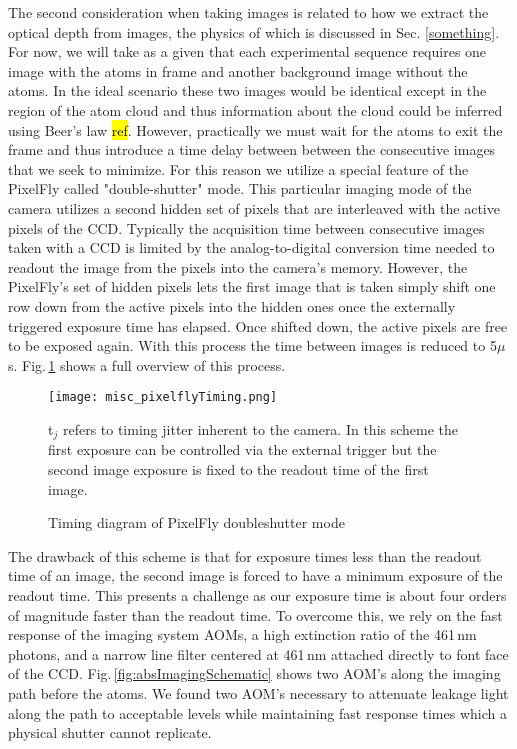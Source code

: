 The second consideration when taking images is related to how we extract the optical depth from images, the physics of which is discussed in Sec. \ref{something}.
For now, we will take as a given that each experimental sequence requires one image with the atoms in frame and another background image without the atoms.
In the ideal scenario these two images would be identical except in the region of the atom cloud and thus information about the cloud could be inferred using Beer's law \hl{ref}.
However, practically we must wait for the atoms to exit the frame and thus introduce a time delay between between the consecutive images that we seek to minimize.
For this reason we utilize a special feature of the PixelFly called "double-shutter" mode.
This particular imaging mode of the camera utilizes a second hidden set of pixels that are interleaved with the active pixels of the CCD.
Typically the acquisition time between consecutive images taken with a CCD is limited by the analog-to-digital conversion time needed to readout the image from the pixels into the camera's memory.
However, the PixelFly's set of hidden pixels lets the first image that is taken simply shift one row down from the active pixels into the hidden ones once the externally triggered exposure time has elapsed.
Once shifted down, the active pixels are free to be exposed again.
With this process the time between images is reduced to 5$\mu$s.
Fig.\,\ref{fig:pixelflyTiming} shows a full overview of this process.
	\begin{figure} 
		\centerline{
		\texttt{[image: misc\_pixelflyTiming.png]}}
		\caption{Timing diagram of PixelFly doubleshutter mode}{t$_j$ refers to timing jitter inherent to the camera. In this scheme the first exposure can be controlled via the external trigger but the second image exposure is fixed to the readout time of the first image.}
		\label{fig:pixelflyTiming}
	\end{figure}
The drawback of this scheme is that for exposure times less than the readout time of an image, the second image is forced to have a minimum exposure of the readout time.
This presents a challenge as our exposure time is about four orders of magnitude faster than the readout time.
To overcome this, we rely on the fast response of the imaging system AOMs, a high extinction ratio of the 461\,nm photons, and a narrow line filter centered at 461\,nm attached directly to font face of the CCD.
Fig.\,\ref{fig:absImagingSchematic} shows two AOM's along the imaging path before the atoms.
We found two AOM's necessary to attenuate leakage light along the path to acceptable levels while maintaining fast response times which a physical shutter cannot replicate.

